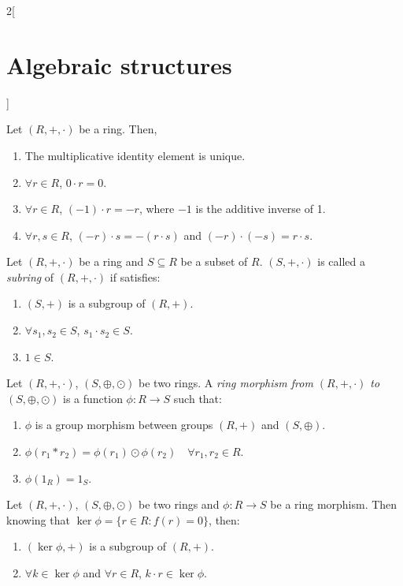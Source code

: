 \documentclass[../../../main.tex]{subfiles}
\begin{document}
\begin{multicols}{2}[\section{Algebraic structures}]
\begin{lemma}
    Let $(R,+,\cdot)$ be a ring. Then,
    \begin{enumerate}
        \item The multiplicative identity element is unique.
        \item $\forall r\in R$, $0\cdot r=0$.
        \item $\forall r\in R$, $(-1)\cdot r=-r$, where $-1$ is the additive inverse of 1.
        \item $\forall r,s\in R$, $(-r)\cdot s=-(r\cdot s)$ and $(-r)\cdot (-s)=r\cdot s$.
    \end{enumerate}
\end{lemma}
\begin{definition}[Subring]
    Let $(R,+,\cdot)$ be a ring and $S\subseteq R$ be a subset of $R$. $(S,+,\cdot)$ is called a \textit{subring} of $(R,+,\cdot)$ if satisfies:
    \begin{enumerate}
        \item $(S,+)$ is a subgroup of $(R,+)$.
        \item $\forall s_1,s_2\in S$, $s_1\cdot s_2\in S$.
        \item $1\in S$.
    \end{enumerate}
\end{definition}
\begin{definition}
    Let $(R,+,\cdot)$, $(S,\oplus,\odot)$ be two rings. A \textit{ring morphism from $(R,+,\cdot)$ to $(S,\oplus,\odot)$} is a function $\phi:R\rightarrow S$ such that:
    \begin{enumerate}
        \item $\phi$ is a group morphism between groups $(R,+)$ and $(S,\oplus)$.
        \item $\phi(r_1*r_2)=\phi(r_1)\odot\phi(r_2)\quad\forall r_1,r_2\in R$.
        \item $\phi(1_R)=1_S$.
    \end{enumerate}
\end{definition}
\begin{lemma}
    Let $(R,+,\cdot)$, $(S,\oplus,\odot)$ be two rings and $\phi:R\rightarrow S$ be a ring morphism. Then knowing that $\ker\phi=\{r\in R:f(r)=0\}$, then:
    \begin{enumerate}
        \item $(\ker\phi,+)$ is a subgroup of $(R,+)$.
        \item $\forall k\in\ker\phi$ and $\forall r\in R$, $k\cdot r\in\ker\phi$.
    \end{enumerate}

\end{lemma}
\end{multicols}
\end{document}
